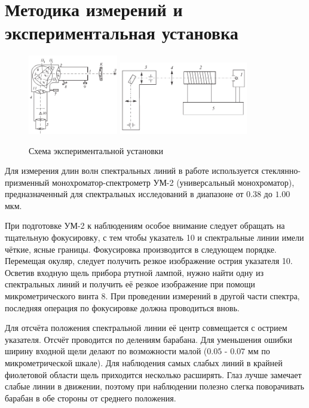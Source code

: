 \documentclass[a4paper, 12pt]{article}
\begin{document}
    \newpage
    
    \section{Методика измерений и экспериментальная установка}

    \begin{figure}[H]
        \centering
        \includegraphics[width = 0.35\textwidth]{images/setup_1.pdf}
        \includegraphics[width = 0.5\textwidth]{images/setup_2.pdf}
        \caption{Схема экспериментальной установки}
        \label{fig:exp_scheme}
    \end{figure}

    Для измерения длин волн спектральных линий в работе используется стеклянно-призменный монохроматор-спектрометр УМ-2 (универсальный монохроматор), предназначенный для спектральных исследований в диапазоне от $0.38$ до $1.00$ мкм.

    При подготовке УМ-2 к наблюдениям особое внимание следует обращать на тщательную фокусировку, с тем чтобы указатель 10 и спектральные линии имели чёткие, ясные границы. Фокусировка производится в следующем порядке. Перемещая окуляр, следует получить резкое изображение острия указателя 10. Осветив входную щель прибора ртутной лампой, нужно найти одну из спектральных линий и получить её резкое изображение при помощи микрометрического винта 8. При проведении измерений в другой части спектра, последняя операция по фокусировке должна проводиться вновь.
    
    Для отсчёта положения спектральной линии её центр совмещается с острием указателя. Отсчёт проводится по делениям барабана. Для уменьшения ошибки ширину входной щели делают по возможности малой ($0.05$ - $0.07$ мм по микрометрической шкале). Для наблюдения самых слабых линий в крайней фиолетовой области щель приходится несколько расширять. Глаз лучше замечает слабые линии в движении, поэтому при наблюдении полезно слегка поворачивать барабан в обе стороны от среднего положения.
    
\end{document}
